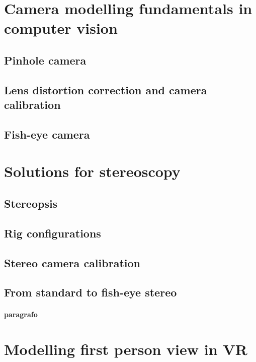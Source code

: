 

\section{Camera modelling fundamentals in computer vision}

\subsection{Pinhole camera}

\subsection{Lens distortion correction and camera calibration}

\subsection{Fish-eye camera}


\section{Solutions for stereoscopy}

\subsection{Stereopsis}

\subsection{Rig configurations}

\subsection{Stereo camera calibration}

\subsection{From standard to fish-eye stereo}


\paragraph{paragrafo}

\section{Modelling first person view in VR}


